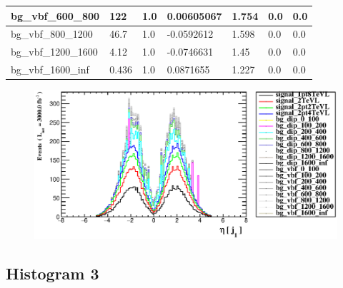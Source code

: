 \documentclass[a4paper, 10pt]{article}
\begin{document}
\begin{table}[H]
\begin{center}
\begin{tabular}{|m{23.0mm}|m{23.0mm}|m{18.0mm}|m{19.0mm}|m{19.0mm}|m{19.0mm}|m{19.0mm}|}
      \hline
      {\cellcolor{white}         bg\_vbf\_600\_800}& {\cellcolor{white}         122}& {\cellcolor{white}         1.0}& {\cellcolor{white}         0.00605067}& {\cellcolor{white}         1.754}& {\cellcolor{green}         0.0}& {\cellcolor{green}         0.0}\\
      \hline
      {\cellcolor{white}         bg\_vbf\_800\_1200}& {\cellcolor{white}         46.7}& {\cellcolor{white}         1.0}& {\cellcolor{white}         -0.0592612}& {\cellcolor{white}         1.598}& {\cellcolor{green}         0.0}& {\cellcolor{green}         0.0}\\
      \hline
      {\cellcolor{white}         bg\_vbf\_1200\_1600}& {\cellcolor{white}         4.12}& {\cellcolor{white}         1.0}& {\cellcolor{white}         -0.0746631}& {\cellcolor{white}         1.45}& {\cellcolor{green}         0.0}& {\cellcolor{green}         0.0}\\
      \hline
      {\cellcolor{white}         bg\_vbf\_1600\_inf}& {\cellcolor{white}         0.436}& {\cellcolor{white}         1.0}& {\cellcolor{white}         0.0871655}& {\cellcolor{white}         1.227}& {\cellcolor{green}         0.0}& {\cellcolor{green}         0.0}\\
\hline
    \end{tabular}
  \end{center}
\end{table}

\begin{figure}[H]
  \begin{center}
    \includegraphics[scale=0.45]{selection_1.eps}\\
\caption{   }
  \end{center}
\end{figure}
      \newpage
\subsection{ Histogram 3}
\end{document}
